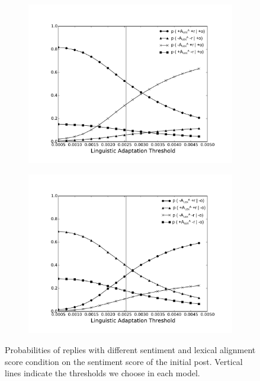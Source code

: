 \documentclass[man,biblatex,floatsintext]{apa6}
\newcommand{\up}{\vspace*{-12pt}}
\begin{document}
\begin{figure}[!htb]

\begin{subfigure}{.5\textwidth}
  \centering
  \includegraphics[width=\linewidth]{Figures/LexAposi_new_rob_New_Enlarge.pdf}
  \caption{\label{fig:ProbLexPoso}}
\end{subfigure}%
\begin{subfigure}{.5\textwidth}
  \centering
  \includegraphics[width=\linewidth]{Figures/LexAnegi_new_rob_New_Enlarge.pdf}
  \caption{\label{fig:ProbLexNego}}
\end{subfigure}%
\caption{Probabilities of replies with different sentiment and lexical alignment score condition on the sentiment score of the initial post. Vertical lines indicate the thresholds we choose in each model.}
\label{fig:Probability_Change_Lex}
\up
\end{figure}
\end{document}
